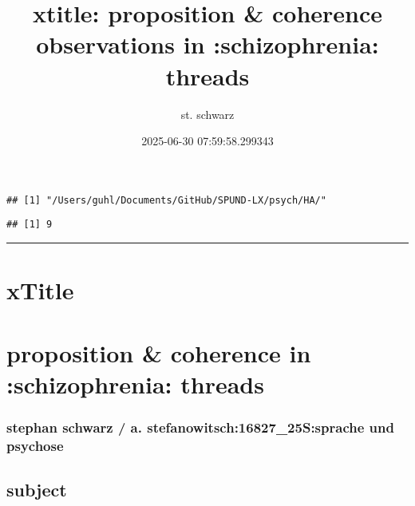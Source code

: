 \documentclass[]{tufte-handout}
\title[xtitle]{xtitle: proposition \& coherence observations in
:schizophrenia: threads}
\author{st. schwarz}
\date{2025-06-30 07:59:58.299343}
\begin{document}
\maketitle




\begin{verbatim}
## [1] "/Users/guhl/Documents/GitHub/SPUND-LX/psych/HA/"
\end{verbatim}

\begin{verbatim}
## [1] 9
\end{verbatim}

\begin{center}\rule{0.5\linewidth}{0.5pt}\end{center}

\section{xTitle}\label{xtitle}

\section{proposition \& coherence in :schizophrenia:
threads}\label{proposition-coherence-in-schizophrenia-threads}

\subsubsection{stephan schwarz / a. stefanowitsch:16827\_25S:sprache und
psychose}\label{stephan-schwarz-a.-stefanowitsch16827_25ssprache-und-psychose}

\subsection{subject}\label{subject}
\end{document}
